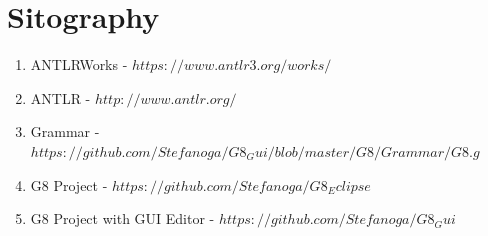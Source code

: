 \documentclass[a4paper]{article}
\begin{document}
\newpage

\section{Sitography}

\begin{enumerate}
\item ANTLRWorks -  \href{https://www.antlr3.org/works/}{$https://www.antlr3.org/works/$} 
\item ANTLR - \href{http://www.antlr.org/}{$http://www.antlr.org/$}
\item Grammar - \href{https://github.com/Stefanoga/G8_Gui/blob/master/G8/Grammar/G8.g}{$https://github.com/Stefanoga/G8_Gui/blob/master/G8/Grammar/G8.g$}
\label{grammar}
\item G8 Project - \href{https://github.com/Stefanoga/G8_Eclipse}{$https://github.com/Stefanoga/G8_Eclipse$}
\item G8 Project with GUI Editor - \href{https://github.com/Stefanoga/G8_Gui}{$https://github.com/Stefanoga/G8_Gui$}
\end{enumerate}
\end{document}
